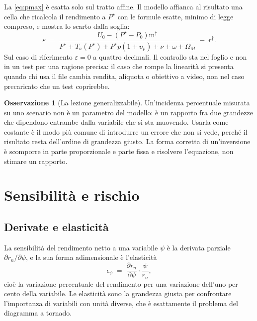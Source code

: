 \documentclass[11pt,a4paper]{article}
\theoremstyle{definition}
\newtheorem{osservazione}[definizione]{Osservazione}
\theoremstyle{plain}
\begin{document}
La \eqref{eq:pmax} è esatta solo sul tratto affine. Il modello affianca al risultato una cella che ricalcola il rendimento a $P^\star$ con le formule esatte, minimo di legge compreso, e mostra lo scarto dalla soglia:
\begin{equation}
\varepsilon \;=\; \frac{U_0 - (P^\star-P_0)\mathrm{m}^\dagger}{P^\star + T_a(P^\star) + P^\star p(1+\upsilon_p) + \nu + \omega + \Omega_M} \;-\; r^\dagger .
\label{eq:controllo}
\end{equation}
Sul caso di riferimento $\varepsilon = 0$ a quattro decimali. Il controllo sta nel foglio e non in un test per una ragione precisa: il caso che rompe la linearità si presenta quando chi usa il file cambia rendita, aliquota o obiettivo a video, non nel caso precaricato che un test coprirebbe.

\begin{osservazione}[La lezione generalizzabile]
Un'incidenza percentuale misurata su uno scenario non è un parametro del modello: è un rapporto fra due grandezze che dipendono entrambe dalla variabile che si sta muovendo. Usarla come costante è il modo più comune di introdurre un errore che non si vede, perché il risultato resta dell'ordine di grandezza giusto. La forma corretta di un'inversione è scomporre in parte proporzionale e parte fissa e risolvere l'equazione, non stimare un rapporto.
\end{osservazione}

\section{Sensibilità e rischio}

\subsection{Derivate e elasticità}

La sensibilità del rendimento netto a una variabile $\psi$ è la derivata parziale $\partial r_n/\partial \psi$, e la sua forma adimensionale è l'elasticità
\begin{equation}
\epsilon_\psi \;=\; \frac{\partial r_n}{\partial \psi}\cdot\frac{\psi}{r_n},
\label{eq:elasticita}
\end{equation}
cioè la variazione percentuale del rendimento per una variazione dell'uno per cento della variabile. Le elasticità sono la grandezza giusta per confrontare l'importanza di variabili con unità diverse, che è esattamente il problema del diagramma a tornado.
\end{document}
